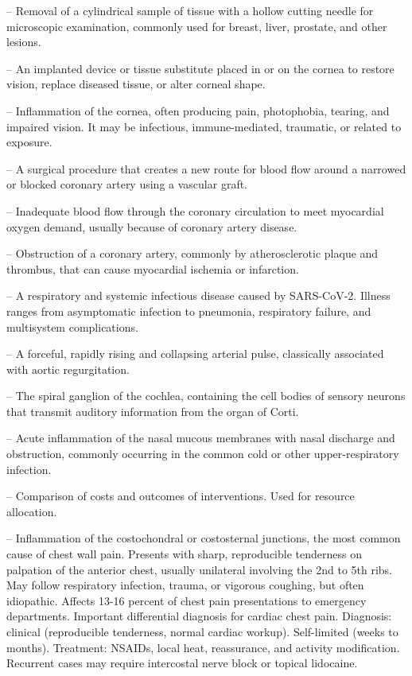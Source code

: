 -- Removal of a cylindrical sample of tissue with a hollow cutting needle for microscopic examination, commonly used for breast, liver, prostate, and other lesions.

-- An implanted device or tissue substitute placed in or on the cornea to restore vision, replace diseased tissue, or alter corneal shape.

-- Inflammation of the cornea, often producing pain, photophobia, tearing, and impaired vision. It may be infectious, immune-mediated, traumatic, or related to exposure.

-- A surgical procedure that creates a new route for blood flow around a narrowed or blocked coronary artery using a vascular graft.

-- Inadequate blood flow through the coronary circulation to meet myocardial oxygen demand, usually because of coronary artery disease.

-- Obstruction of a coronary artery, commonly by atherosclerotic plaque and thrombus, that can cause myocardial ischemia or infarction.

-- A respiratory and systemic infectious disease caused by SARS-CoV-2. Illness ranges from asymptomatic infection to pneumonia, respiratory failure, and multisystem complications.

-- A forceful, rapidly rising and collapsing arterial pulse, classically associated with aortic regurgitation.

-- The spiral ganglion of the cochlea, containing the cell bodies of sensory neurons that transmit auditory information from the organ of Corti.

-- Acute inflammation of the nasal mucous membranes with nasal discharge and obstruction, commonly occurring in the common cold or other upper-respiratory infection.

-- Comparison of costs and outcomes of interventions. Used for resource allocation.

-- Inflammation of the costochondral or costosternal junctions, the most common cause of chest wall pain. Presents with sharp, reproducible tenderness on palpation of the anterior chest, usually unilateral involving the 2nd to 5th ribs. May follow respiratory infection, trauma, or vigorous coughing, but often idiopathic. Affects 13-16 percent of chest pain presentations to emergency departments. Important differential diagnosis for cardiac chest pain. Diagnosis: clinical (reproducible tenderness, normal cardiac workup). Self-limited (weeks to months). Treatment: NSAIDs, local heat, reassurance, and activity modification. Recurrent cases may require intercostal nerve block or topical lidocaine.

